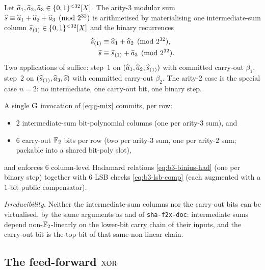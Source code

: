 \begin{definition}\label{def:b3-chain}
Let $\widehat{a}_1, \widehat{a}_2, \widehat{a}_3 \in \{0,1\}^{<32}[X]$. The arity-$3$
modular sum
$\widehat{s} \equiv \widehat{a}_1 + \widehat{a}_2 + \widehat{a}_3 \pmod{2^{32}}$ is
arithmetised by materialising one intermediate-sum column
$\widehat{s}_{(1)} \in \{0,1\}^{<32}[X]$ and the binary recurrences
\begin{align*}
\widehat{s}_{(1)} &\equiv \widehat{a}_1 + \widehat{a}_2 \pmod{2^{32}}, \\
\widehat{s}       &\equiv \widehat{s}_{(1)} + \widehat{a}_3 \pmod{2^{32}}.
\end{align*}
Two applications of  suffice: step~$1$ on
$(\widehat{a}_1, \widehat{a}_2, \widehat{s}_{(1)})$ with committed carry-out
$\beta_1$, step~$2$ on $(\widehat{s}_{(1)}, \widehat{a}_3, \widehat{s})$ with
committed carry-out $\beta_2$. The arity-$2$ case is the special case
$n = 2$: no intermediate, one carry-out bit, one binary step.
\end{definition}

\begin{proposition}\label{prop:b3-gmix-count}
A single $\operatorname{G}$ invocation of \eqref{eq:g-mix} commits, per row:
\begin{itemize}[leftmargin=2em,topsep=2pt]
  \item $2$ intermediate-sum bit-polynomial columns
        (one per arity-$3$ sum), and
  \item $6$ carry-out $\mathbb{F}_2$ bits per row (two per arity-$3$ sum, one
        per arity-$2$ sum; packable into a shared bit-poly slot),
\end{itemize}
and enforces $6$ column-level Hadamard relations
\eqref{eq:b3-binius-had} (one per binary step) together with $6$ LSB
checks \eqref{eq:b3-lsb-comp} (each augmented with a $1$-bit public
compensator).

\emph{Irreducibility.} Neither the intermediate-sum columns nor the
carry-out bits can be virtualised, by the same arguments as
 and  of
\texttt{sha-f2x-doc}: intermediate sums depend non-$\mathbb{F}_2$-linearly on
the lower-bit carry chain of their inputs, and the carry-out bit is
the top bit of that same non-linear chain.
\end{proposition}

\subsection{The feed-forward $\operatorname{XOR}$}\label{sec:b3-ff}

